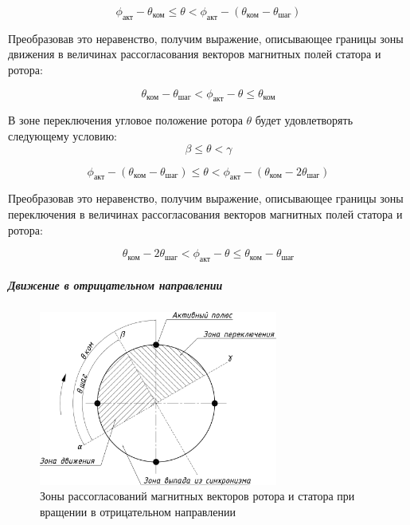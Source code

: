 \begin{equation}
    \label{movement_zone_posit_dir_for_curr_pos}
    \phi_\textit{акт} - \theta_\textit{ком}
    \leq \theta <
    \phi_\textit{акт} - (\theta_\textit{ком} - \theta_\textit{шаг})
\end{equation}

Преобразовав это неравенство, получим выражение, описывающее границы зоны движения
в величинах рассогласования векторов магнитных полей статора и ротора:

\begin{equation}
    \label{movement_zone_posit_dir_for_delta}
    \theta_\textit{ком} - \theta_\textit{шаг}
    < \phi_\textit{акт} - \theta
    \leq \theta_\textit{ком}
\end{equation}

В зоне переключения угловое положение ротора $\theta$ будет удовлетворять следующему условию:
$$
    \beta \leq \theta < \gamma
$$

\begin{equation}
    \label{switch_zone_posit_dir_for_curr_pos}
    \phi_\textit{акт} - (\theta_\textit{ком} - \theta_\textit{шаг})
    \leq \theta <
    \phi_\textit{акт} - (\theta_\textit{ком} - 2\theta_\textit{шаг})
\end{equation}

Преобразовав это неравенство, получим выражение, описывающее границы зоны переключения
в величинах рассогласования векторов магнитных полей статора и ротора:

\begin{equation}
    \label{switch_zone_posit_dir_for_delta}
    \theta_\textit{ком} - 2\theta_\textit{шаг}
    < \phi_\textit{акт} - \theta
    \leq \theta_\textit{ком} - \theta_\textit{шаг}
\end{equation}


\subparagraph{Движение в отрицательном направлении}
\begin{figure}
    \centering
    \includegraphics[width=0.7\textwidth, keepaspectratio]
                    {./src/pictures/feedback_control/pole_switch_zones_with_negative_dir}
    \caption{Зоны рассогласований магнитных векторов ротора и статора при вращении в отрицательном направлении}
    \label{pole_switch_zones_with_negative_dir}
\end{figure}

